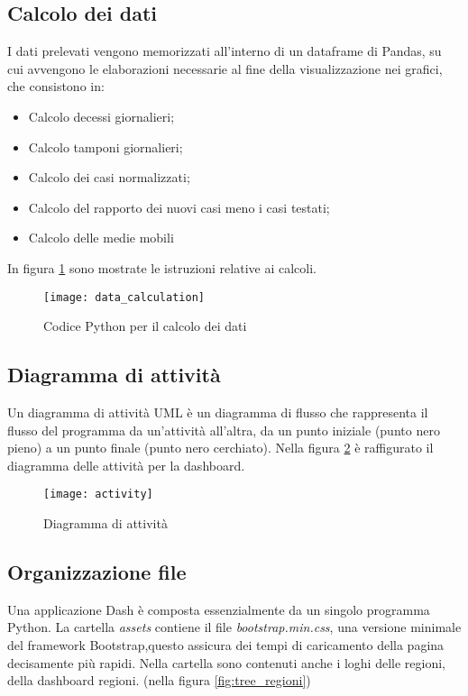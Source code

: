\subsection{Calcolo dei dati}
I dati prelevati vengono memorizzati all’interno di un dataframe di Pandas, su cui avvengono le elaborazioni necessarie al fine della visualizzazione nei grafici, che consistono in:
\begin{itemize}
\item Calcolo decessi giornalieri;
\item Calcolo tamponi giornalieri;
\item Calcolo dei casi normalizzati;
\item Calcolo del rapporto dei nuovi casi meno i casi testati;
\item Calcolo delle medie mobili
\end{itemize}
In figura \ref{fig:calcolo_dati} sono mostrate le istruzioni relative ai calcoli.

\begin{figure}[htp]
    \centering
    \texttt{[image: data\_calculation]}
    \caption{Codice Python per il calcolo dei dati}
    \label{fig:calcolo_dati}
\end{figure}

\subsection{Diagramma di attività}
Un diagramma di attività UML è un diagramma di flusso che rappresenta il flusso del programma da un'attività all'altra, da un punto iniziale (punto nero pieno) a un punto finale (punto nero cerchiato).
Nella figura \ref{fig:activity} è raffigurato il diagramma delle attività per la dashboard.
\begin{figure}[htp]
    \centering
    \texttt{[image: activity]}
    \caption{Diagramma di attività}
    \label{fig:activity}
\end{figure}

\subsection{Organizzazione file}
Una applicazione Dash è composta essenzialmente da un singolo programma Python.
La cartella \emph{assets} contiene il file \emph{bootstrap.min.css}, una versione minimale del framework Bootstrap,\footnotemark questo assicura dei tempi di caricamento della pagina decisamente più rapidi.
Nella cartella sono contenuti anche i loghi delle regioni, della dashboard regioni. (nella figura \ref{fig:tree_regioni})

